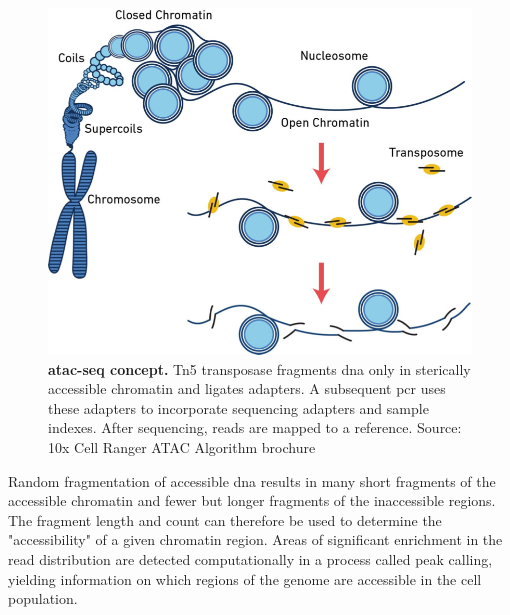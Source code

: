 \begin{figure}
	\begin{minipage}[]{0.6\textwidth}
		\includegraphics[width=\textwidth]{./ims/atacseq.png}
	\end{minipage}\hfill
	\begin{minipage}[]{0.35\textwidth}
		\caption[ATAC-seq concept]{\textbf{\acrshort{atac-seq} concept.} Tn5 transposase fragments \acrshort{dna} only in sterically accessible chromatin and ligates adapters. A subsequent \acrshort{pcr} uses these adapters to incorporate sequencing adapters and sample indexes. After sequencing, reads are mapped to a reference. Source: 10x Cell Ranger ATAC Algorithm brochure}
		\label{fig:atacseq}
	\end{minipage}
\end{figure}

Random fragmentation of accessible \acrshort{dna} results in many short fragments of the accessible chromatin and fewer but longer fragments of the inaccessible regions. The fragment length and count can therefore be used to determine the "accessibility" of a given chromatin region. Areas of significant enrichment in the read distribution are detected computationally in a process called peak calling, yielding information on which regions of the genome are accessible in the cell population.\pms


